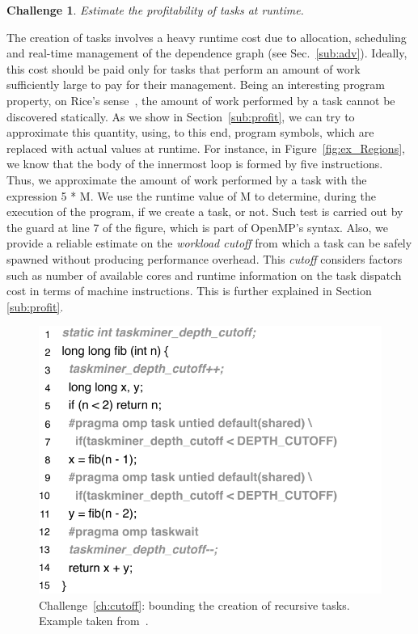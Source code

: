 \documentclass[sigplan,10pt,review,anonymous]{acmart}
\newtheorem{Challenge}{Challenge}[section]
\begin{document}
\begin{Challenge}
\label{ch:cost}
Estimate the profitability of tasks at runtime.
\end{Challenge}

The creation of tasks involves a heavy runtime cost due to allocation,
scheduling and real-time management of the dependence graph
(see Sec.~\ref{sub:adv}).
Ideally, this cost should be paid only for tasks that perform an amount of work
sufficiently large to pay for their management.
Being an interesting program property, on Rice's sense~\cite{Rice53}, the amount
of work performed by a task cannot be discovered statically.
As we show in Section~\ref{sub:profit}, we can try to approximate this quantity, using,
to this end, program symbols, which are replaced with actual values at runtime.
For instance, in Figure~\ref{fig:ex_Regions}, we know that the body of the
innermost loop is formed by five instructions.
Thus, we approximate the amount of work performed by a task with the
expression \textsf{5 * M}.
We use the runtime value of \textsf{M} to determine, during the execution of the
program, if we create a task, or not.
Such test is carried out by the guard at line 7 of the figure, which is part of
OpenMP's syntax. Also, we provide a reliable estimate on the \emph{workload cutoff}
from which a task can be safely spawned without producing performance overhead.
This \emph{cutoff} considers factors such as number of available cores
and runtime information on the task dispatch cost in terms of machine
instructions. This is further explained in Section \ref{sub:profit}.

\begin{figure}[h!]
\begin{center}
\includegraphics[width=1\columnwidth]{images/ex_cutoff}
\caption{Challenge~\ref{ch:cutoff}: bounding the creation of recursive tasks.
Example taken from~\cite[Fig.1]{Iwasaki16}.}
\label{fig:ex_cutoff}
\end{center}
\end{figure}
\end{document}
